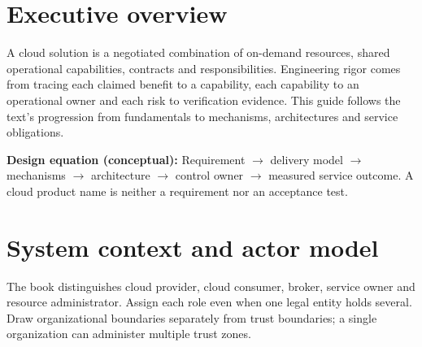 \documentclass[10pt,letterpaper]{article}
\begin{document}
\sourceStatement
\tableofcontents
\newpage
\section{Executive overview}
A cloud solution is a negotiated combination of on-demand resources, shared operational capabilities, contracts and responsibilities. Engineering rigor comes from tracing each claimed benefit to a capability, each capability to an operational owner and each risk to verification evidence. This guide follows the text's progression from fundamentals to mechanisms, architectures and service obligations.
\begin{takeaway}
\textbf{Design equation (conceptual):} Requirement $\rightarrow$ delivery model $\rightarrow$ mechanisms $\rightarrow$ architecture $\rightarrow$ control owner $\rightarrow$ measured service outcome. A cloud product name is neither a requirement nor an acceptance test.\end{takeaway}
\section{System context and actor model}
The book distinguishes cloud provider, cloud consumer, broker, service owner and resource administrator. Assign each role even when one legal entity holds several. Draw organizational boundaries separately from trust boundaries; a single organization can administer multiple trust zones.\\
\begin{center}
\end{center}
\end{document}
